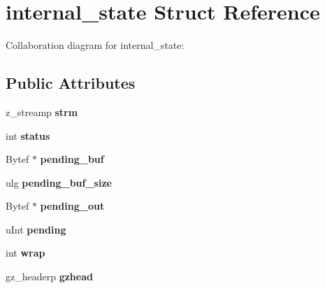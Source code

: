 \hypertarget{structinternal__state}{\section{internal\+\_\+state Struct Reference}
\label{structinternal__state}
}


Collaboration diagram for internal\+\_\+state\+:
\subsection*{Public Attributes}
\begin{DoxyCompactItemize}
\item 
\hypertarget{structinternal__state_aaf558a49ab8c6caea3d131c6b913db42}{z\+\_\+streamp {\bfseries strm}}\label{structinternal__state_aaf558a49ab8c6caea3d131c6b913db42}

\item 
\hypertarget{structinternal__state_a8756cacdbac452a2633f87e06fae6c52}{int {\bfseries status}}\label{structinternal__state_a8756cacdbac452a2633f87e06fae6c52}

\item 
\hypertarget{structinternal__state_a4998af1dd95f4ce89a420c75c3df887e}{Bytef $\ast$ {\bfseries pending\+\_\+buf}}\label{structinternal__state_a4998af1dd95f4ce89a420c75c3df887e}

\item 
\hypertarget{structinternal__state_a9100ecccf2f8bb474f0bcc7c69f55c27}{ulg {\bfseries pending\+\_\+buf\+\_\+size}}\label{structinternal__state_a9100ecccf2f8bb474f0bcc7c69f55c27}

\item 
\hypertarget{structinternal__state_aa35c3b4c7163a9650a6a893156d6c522}{Bytef $\ast$ {\bfseries pending\+\_\+out}}\label{structinternal__state_aa35c3b4c7163a9650a6a893156d6c522}

\item 
\hypertarget{structinternal__state_ac92f5b70c269be4685539daef10b15a3}{u\+Int {\bfseries pending}}\label{structinternal__state_ac92f5b70c269be4685539daef10b15a3}

\item 
\hypertarget{structinternal__state_ae80327ea7ad4ad0ef5baeef5ef3a6807}{int {\bfseries wrap}}\label{structinternal__state_ae80327ea7ad4ad0ef5baeef5ef3a6807}

\item 
\hypertarget{structinternal__state_ac023d0c9e6112dfe6cbd049a56484997}{gz\+\_\+headerp {\bfseries gzhead}}\label{structinternal__state_ac023d0c9e6112dfe6cbd049a56484997}


\end{DoxyCompactItemize}

